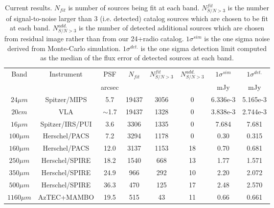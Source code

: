\documentclass[11pt,a4paper]{article}
\begin{document}
\begin{table}[h]
	\centering
	\begin{tabular}{cccccccc}
		\hline
		\hline
		Band         &  Instrument  &   PSF  &  $N_{fit}$ &  $N^{fit}_{S/N>3}$ &  $N^{add.}_{S/N>3}$ &  $1\sigma^{sim}$ &  $1\sigma^{det.}$ \\
		&              & arcsec &            &              &                    &              mJy &               mJy \\
		\hline                                                                                                                         
		$24{\mu}m$   &     Spitzer/MIPS  &       5.7 &      19437 &         3056 &          0 &         6.336e-3 &          5.165e-3 \\
		$20{c}m$     &              VLA  & $\sim$1.7 &      19437 &         1328 &          0 &         3.838e-3 &          2.744e-3 \\
		$16{\mu}m$   &  Spitzer/IRS/PUI  &       3.6 &       3306 &         1335 &          0 &            7.684 &             7.681 \\
		$100{\mu}m$  &    Herschel/PACS  &       7.2 &       3294 &         1178 &          0 &             0.30 &             0.315 \\
		$160{\mu}m$  &    Herschel/PACS  &      12.0 &       3137 &         1153 &         18 &             0.70 &             0.681 \\
		$250{\mu}m$  &   Herschel/SPIRE  &      18.2 &       1540 &          668 &         13 &             1.77 &             1.571 \\
		$350{\mu}m$  &   Herschel/SPIRE  &      24.9 &        966 &          292 &         10 &             2.20 &             2.072 \\
		$500{\mu}m$  &   Herschel/SPIRE  &      36.3 &        470 &          125 &         17 &             2.48 &             2.570 \\
		$1160{\mu}m$ &      AzTEC+MAMBO  &      19.5 &        515 &           43 &         11 &             0.66 &             0.661 \\
		\hline
	\end{tabular}
	\caption{ Current results. $N_{fit}$ is number of sources being fit at each band. $N^{fit}_{S/N>3}$ is the number of signal-to-noise larger than 3 (i.e. detected) catalog sources which are chosen to be fit at each band. $N^{add.}_{S/N>3}$ is the number of detected additional sources which are chosen from residual image rather than from our 24+radio catalog. $1\sigma^{sim}$ is the one sigma noise derived from Monte-Carlo simulation. $1\sigma^{det.}$ is the one sigma detection limit computed as the median of the flux error of detected sources at each band. 
		\label{CurrentResultsTable}}
\end{table}
\end{document}
